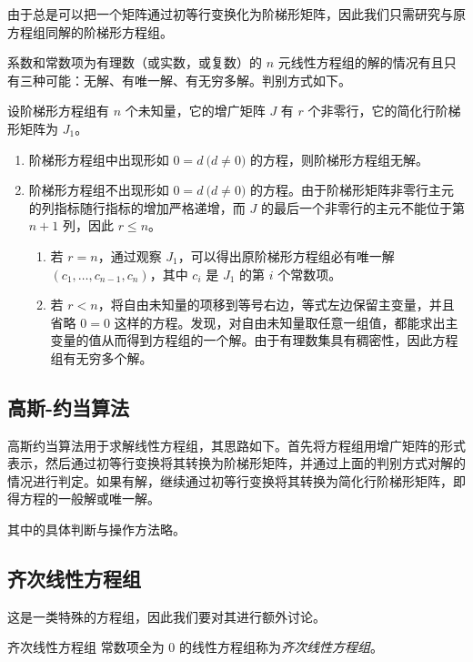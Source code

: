由于总是可以把一个矩阵通过初等行变换化为阶梯形矩阵，因此我们只需研究与原方程组同解的阶梯形方程组。

\begin{theorem}
	系数和常数项为有理数（或实数，或复数）的 $n$ 元线性方程组的解的情况有且只有三种可能：无解、有唯一解、有无穷多解。判别方式如下。

	设阶梯形方程组有 $n$ 个未知量，它的增广矩阵 $J$ 有 $r$ 个非零行，它的简化行阶梯形矩阵为 $J_1$。
	\begin{enumerate}
		\item 阶梯形方程组中出现形如 $0 = d \pod{d \ne 0}$ 的方程，则阶梯形方程组无解。
		\item 阶梯形方程组不出现形如 $0 = d \pod{d \ne 0}$ 的方程。由于阶梯形矩阵非零行主元的列指标随行指标的增加严格递增，而 $J$ 的最后一个非零行的主元不能位于第 $n + 1$ 列，因此 $r \le n$。
		\begin{enumerate}
			\item 若 $r = n$，通过观察 $J_1$，可以得出原阶梯形方程组必有唯一解 $(c_1, \ldots, c_{n - 1}, c_n)$，其中 $c_i$ 是 $J_1$ 的第 $i$ 个常数项。
			\item 若 $r < n$，将自由未知量的项移到等号右边，等式左边保留主变量，并且省略 $0 = 0$ 这样的方程。发现，对自由未知量取任意一组值，都能求出主变量的值从而得到方程组的一个解。由于有理数集具有稠密性，因此方程组有无穷多个解。
		\end{enumerate}
	\end{enumerate}
\end{theorem}

\subsection{高斯-约当算法}

高斯约当算法用于求解线性方程组，其思路如下。首先将方程组用增广矩阵的形式表示，然后通过初等行变换将其转换为阶梯形矩阵，并通过上面的判别方式对解的情况进行判定。如果有解，继续通过初等行变换将其转换为简化行阶梯形矩阵，即得方程的一般解或唯一解。

其中的具体判断与操作方法略。

\subsection{齐次线性方程组}

这是一类特殊的方程组，因此我们要对其进行额外讨论。

\begin{definition}{齐次线性方程组}
	常数项全为 $0$ 的线性方程组称为\emph{齐次线性方程组}。
\end{definition}

